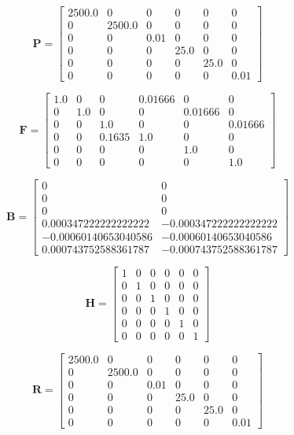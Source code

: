 \documentclass[titlepage, letterpaper]{article}
\begin{document}
\begin{equation*}\pmb{P} = \left[\begin{matrix}2500.0 & 0 & 0 & 0 & 0 & 0\\0 & 2500.0 & 0 & 0 & 0 & 0\\0 & 0 & 0.01 & 0 & 0 & 0\\0 & 0 & 0 & 25.0 & 0 & 0\\0 & 0 & 0 & 0 & 25.0 & 0\\0 & 0 & 0 & 0 & 0 & 0.01\end{matrix}\right]\end{equation*}

\begin{equation*}\pmb{F} = \left[\begin{matrix}1.0 & 0 & 0 & 0.01666 & 0 & 0\\0 & 1.0 & 0 & 0 & 0.01666 & 0\\0 & 0 & 1.0 & 0 & 0 & 0.01666\\0 & 0 & 0.1635 & 1.0 & 0 & 0\\0 & 0 & 0 & 0 & 1.0 & 0\\0 & 0 & 0 & 0 & 0 & 1.0\end{matrix}\right]\end{equation*}

\begin{equation*}\pmb{B} = \left[\begin{matrix}0 & 0\\0 & 0\\0 & 0\\0.000347222222222222 & -0.000347222222222222\\-0.00060140653040586 & -0.00060140653040586\\0.000743752588361787 & -0.000743752588361787\end{matrix}\right]\end{equation*}

\begin{equation*}\pmb{H} = \left[\begin{matrix}1 & 0 & 0 & 0 & 0 & 0\\0 & 1 & 0 & 0 & 0 & 0\\0 & 0 & 1 & 0 & 0 & 0\\0 & 0 & 0 & 1 & 0 & 0\\0 & 0 & 0 & 0 & 1 & 0\\0 & 0 & 0 & 0 & 0 & 1\end{matrix}\right]\end{equation*}

\begin{equation*}\pmb{R} = \left[\begin{matrix}2500.0 & 0 & 0 & 0 & 0 & 0\\0 & 2500.0 & 0 & 0 & 0 & 0\\0 & 0 & 0.01 & 0 & 0 & 0\\0 & 0 & 0 & 25.0 & 0 & 0\\0 & 0 & 0 & 0 & 25.0 & 0\\0 & 0 & 0 & 0 & 0 & 0.01\end{matrix}\right]\end{equation*}
\end{document}
